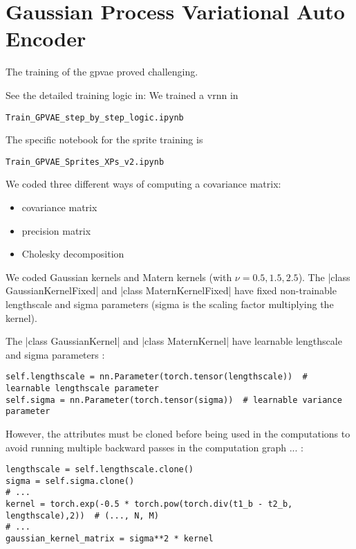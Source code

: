 \section{Gaussian Process Variational Auto Encoder}

The training of the \gls{gpvae} proved challenging.

See the detailed training logic in:
We trained a \gls{vrnn} in
\begin{verbatim}
Train_GPVAE_step_by_step_logic.ipynb
\end{verbatim}

The specific notebook for the sprite training is 
\begin{verbatim}
Train_GPVAE_Sprites_XPs_v2.ipynb
\end{verbatim}

We coded three different ways of computing a covariance matrix:
\begin{itemize}
    \item covariance matrix
    \item precision matrix
    \item Cholesky decomposition
\end{itemize}

We coded Gaussian kernels and Matern kernels (with $\nu = 0.5, 1.5, 2.5$).
The |class GaussianKernelFixed| and |class MaternKernelFixed| have fixed non-trainable lengthscale 
and sigma parameters (sigma is the scaling factor multiplying the kernel).

The |class GaussianKernel| and |class MaternKernel| have learnable lengthscale 
and sigma parameters : 
\begin{verbatim}
self.lengthscale = nn.Parameter(torch.tensor(lengthscale))  # learnable lengthscale parameter    
self.sigma = nn.Parameter(torch.tensor(sigma))  # learnable variance parameter
\end{verbatim}
However, the attributes must be cloned before being used in the computations to avoid running multiple backward passes in the 
computation graph ... :
\begin{verbatim}
lengthscale = self.lengthscale.clone()
sigma = self.sigma.clone()
# ...
kernel = torch.exp(-0.5 * torch.pow(torch.div(t1_b - t2_b, lengthscale),2))  # (..., N, M)
# ...        
gaussian_kernel_matrix = sigma**2 * kernel
\end{verbatim}

